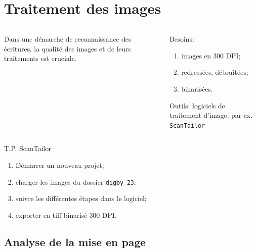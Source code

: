 \documentclass[10pt, compress,urlcolor=blue]{beamer}
\begin{document}


\section{Traitement des images}

\begin{frame}{}
    \begin{columns}
	\begin{column}{0.45\textwidth}
		Dans une démarche de reconnaissance des écritures, la qualité des images
		et de leurs traitements est cruciale.
	\end{column}
	\begin{column}{0.45\textwidth}
		Besoins:
		\begin{enumerate}
		    \item images en 300 DPI;
		    \item redressées, débruitées;
		    \item binarisées.
		\end{enumerate}
		Outils: logiciels de traitement d'image, par ex. \texttt{ScanTailor}
	\end{column}
\end{columns}
    
\end{frame}

\begin{frame}{T.P. ScanTailor}
    
    \begin{enumerate}
        \item Démarrer un nouveau projet;
        \item charger les images du dossier \texttt{digby\_23};
        \item suivre les différentes étapes dans le logiciel;
        \item exporter en tiff binarisé 300 DPI.
    \end{enumerate}
    
\end{frame}

\subsection{Analyse de la mise en page}
\end{document}
